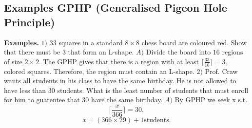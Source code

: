 \documentclass{article}
\begin{document}
\subsection{Examples GPHP (Generalised Pigeon Hole Principle)}
\textbf{Examples. } 
\newline
\newline
$1) $ $33$ squares in a standard $8 \times 8$ chess board are coloured red. Show that there must be $3$ that form
an L-shape. 
\newline
\newline
$A) $ Divide the board into $16$ regions of size $2 \times 2$.
\newline
The GPHP gives that there is a region with at least $\lceil \frac{33}{16} \rceil = 3,$ colored squares.
\newline
Therefore, the region must contain an L-shape.
\newline
\newline
$2) $ Prof. Craw wants all students in his class to have the same birthday. He is not allowed to have less than $30$ students. What is the least number 
of students that must enroll for him to guarentee that $30$ have the same birthday.
\newline
\newline
$A) $ By GPHP we seek x s.t. 
$$\lceil \frac{x}{366} \rceil = 30,$$
$$x = (366 \times 29) + 1\text{students.}$$
\newpage
\end{document}
